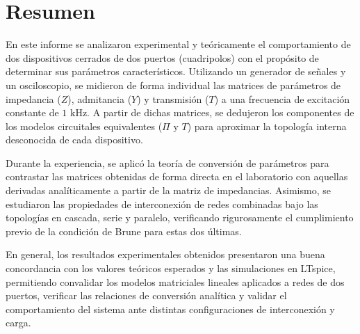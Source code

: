 \section{Resumen}

En este informe se analizaron experimental y teóricamente el comportamiento de dos dispositivos cerrados de dos puertos (cuadripolos) con el propósito de determinar sus parámetros característicos. Utilizando un generador de señales y un osciloscopio, se midieron de forma individual las matrices de parámetros de impedancia ($Z$), admitancia ($Y$) y transmisión ($T$) a una frecuencia de excitación constante de $1\text{ kHz}$. A partir de dichas matrices, se dedujeron los componentes de los modelos circuitales equivalentes ($\Pi$ y $T$) para aproximar la topología interna desconocida de cada dispositivo.

Durante la experiencia, se aplicó la teoría de conversión de parámetros para contrastar las matrices obtenidas de forma directa en el laboratorio con aquellas derivadas analíticamente a partir de la matriz de impedancias. Asimismo, se estudiaron las propiedades de interconexión de redes combinadas bajo las topologías en cascada, serie y paralelo, verificando rigurosamente el cumplimiento previo de la condición de Brune para estas dos últimas.

En general, los resultados experimentales obtenidos presentaron una buena concordancia con los valores teóricos esperados y las simulaciones en LTspice, permitiendo convalidar los modelos matriciales lineales aplicados a redes de dos puertos, verificar las relaciones de conversión analítica y validar el comportamiento del sistema ante distintas configuraciones de interconexión y carga.
\newpage
